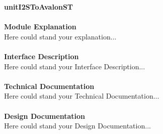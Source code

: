 \documentclass[../../../../doc/ASP-SoC_doc/main.tex]{subfiles}
\begin{document}
\textbf{unitI2SToAvalonST}
\\\\
\textbf{Module Explanation}
\\
Here could stand your explanation...\\
\\
\textbf{Interface Description}
\\
Here could stand your Interface Description...\\
\\
\textbf{Technical Documentation}
\\
Here could stand your Technical Documentation...\\
\\
\textbf{Design Documentation}
\\
Here could stand your Design Documentation...\\
\\
\end{document}

